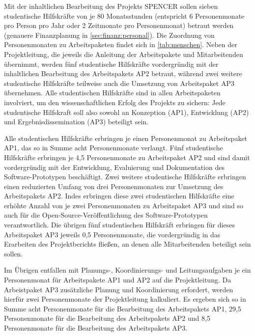 

Mit der inhaltlichen Bearbeitung des Projekts SPENCER sollen sieben studentische Hilfskräfte von je 80 Monatsstunden (entspricht 6 Personenmonate pro Person pro Jahr oder 2 Zeitmonate pro Personenmonat) betraut werden (genauere Finanzplanung in \cref{sec:finanz:personal}).
Die Zuordnung von Personenmonaten zu Arbeitspaketen findet sich in \cref{tab:menschen}.
Neben der Projektleitung, die jeweils die Anleitung der Arbeitspakete und Mitarbeitenden übernimmt, werden fünf studentische Hilfskräfte vordergründig mit der inhaltlichen Bearbeitung des Arbeitspakets AP2 betraut, während zwei weitere studentische Hilfskräfte teilweise auch die Umsetzung von Arbeitspaket AP3 übernehmen.
Alle studentischen Hilfskräfte sind in allen Arbeitspaketen involviert, um den wissenschaftlichen Erfolg des Projekts zu sichern:
Jede studentische Hilfskraft soll also sowohl an Konzeption (AP1), Entwicklung (AP2) und Ergebnisdissemination (AP3) beteiligt sein.

Alle studentischen Hilfskräfte erbringen je einen Personenmonat zu Arbeitspaket AP1, das so in Summe acht Personenmonate verlangt.
Fünf studentische Hilfskräfte erbringen je 4,5 Personenmonate zu Arbeitspaket AP2 und sind damit vordergründig mit der Entwicklung, Evaluierung und Dokumentation des Software-Prototypen beschäftigt.
Zwei weitere studentische Hilfskräfte erbringen einen reduzierten Umfang von drei Personenmonaten zur Umsetzung des Arbeitspakets AP2.
Indes erbringen diese zwei studentischen Hilfskräfte eine erhöhte Anzahl von je zwei Personenmonaten zu Arbeitspaket AP3 und sind so auch für die Open-Source-Veröffentlichung des Software-Prototypen verantwortlich.
Die übrigen fünf studentischen Hilfskräft erbringen für dieses Arbeitspaket AP3 jeweils 0,5 Personenmonate, die vordergründig in das Erarbeiten des Projektberichts fließen, an denen alle Mitarbeitenden beteiligt sein sollen.

Im Übrigen entfallen mit Planungs-, Koordinierungs- und Leitungsaufgaben je ein Personenmonat für Arbeitspakete AP1 und AP2 auf die Projektleitung.
Da Arbeistpaket AP3 zusätzliche Planung und Koordinierung erfordert, werden hierfür zwei Personenmonate der Projektleitung kalkuliert.
Es ergeben sich so in Summe acht Personenmonate für die Bearbeitung des Arbeitspakets AP1, 29,5 Personenmonate für die Bearbeitung des Arbeitspakets AP2 und 8,5 Personenmonate für die Bearbeitung des Arbeitspakets AP3.
